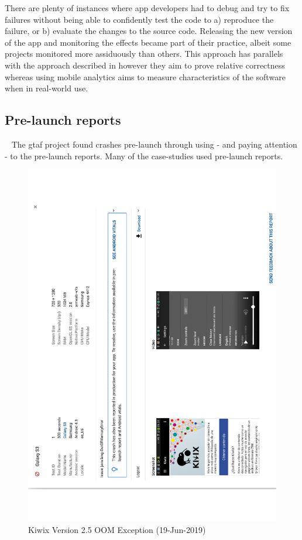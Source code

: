 There are plenty of instances where app developers had to debug and try to fix failures without being able to confidently test the code to a) reproduce the failure, or b) evaluate the changes to the source code. Releasing the new version of the app and monitoring the effects became part of their practice, albeit some projects monitored more assiduously than others. This approach has parallels with the approach described in  however they aim to prove relative correctness whereas using mobile analytics aims to measure characteristics of the software when in real-world use.

\subsection{Pre-launch reports}~\label{aiu-pre-launch-reports}
The \Gls{gtaf} project found crashes pre-launch through using - and paying attention - to the pre-launch reports. Many of the case-studies used pre-launch reports. 

\begin{figure}
    \centering
    \includegraphics[width=\linewidth]{images/google-play-console/Pre-launch_report_Galaxy_S3_OOM_Exception_Details_(19-Jun-2019).pdf}
    \caption{Kiwix Version 2.5 OOM Exception (19-Jun-2019)}
    \label{fig:pre-launch-report-kiwix-oom-also-in-production}
\end{figure}

